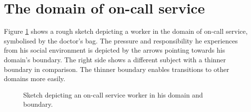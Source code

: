 \documentclass{CML_Seminar_Template}
\begin{document}
\section{The domain of on-call service}
Figure \ref{Boundary_sketch_fig} shows a rough sketch depicting a worker in the domain of on-call service, symbolised by the doctor's bag. The pressure and responsibility he experiences from his social environment is depicted by the arrows pointing towards his domain's boundary. The right side shows a different subject with a thinner boundary in comparison. The thinner boundary enables transitions to other domains more easily.
\begin{figure}[htb]
  \begin{center}
  \end{center}
    \caption{\label{Boundary_sketch_fig}  Sketch depicting an on-call service worker in his domain and boundary. }
\end{figure}
\end{document}
